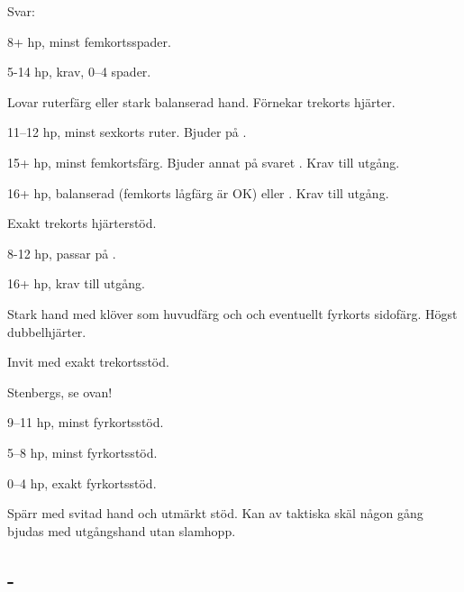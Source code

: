 Svar:
\begin{beskriv}
   \item[\NT{1}] 8+ hp, minst femkortsspader.
   \item[\spa{1}] 5-14 hp, krav, 0--4 spader. 
   \item[\kl{2}] Lovar ruterf\"arg eller stark balanserad hand. Förnekar
                 trekorts hjärter.
         \begin{nummer}
           \item 11--12 hp, minst sexkorts ruter. Bjuder  på .
           \item 15+ hp, minst femkortsf{\"a}rg. Bjuder annat p{\aa} svaret
                      . Krav till utgång.
	   \item 16+ hp, balanserad (femkorts lågfärg är OK) eller
                        . Krav till utgång.
          \end{nummer}
   \item[\ru{2}] Exakt trekorts hj\"arterst\"od.
          \begin{nummer}
            \item 8-12 hp, passar på .
            \item 16+ hp, krav till utgång.
           \end{nummer}
   \item[\hj{2}] Stark hand med kl\"over som
                 huvudf\"arg och och eventuellt fyrkorts sidofärg. Högst
                 dubbelhjärter.
   \item[\spa{2}] Invit med exakt trekortsstöd.
   \item[\NT{2}] Stenbergs, se ovan!
   \item[\kl{3}] 9--11 hp, minst fyrkortsstöd.
   \item[\ru{3}] 5--8 hp, minst fyrkortsstöd.
   \item[\hj{3}] 0--4 hp, exakt fyrkortsstöd.
   \item[\hj{4}] Spärr med svitad hand och utmärkt stöd. Kan av taktiska
     skäl någon gång bjudas med utgångshand utan slamhopp.
\end{beskriv}

\subsection{ - }

